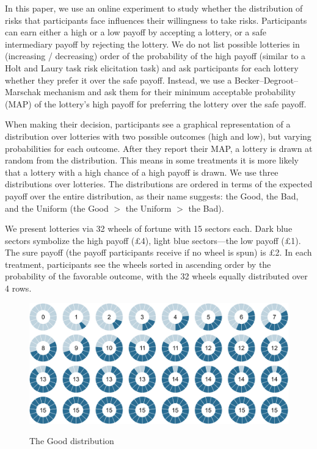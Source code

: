 \documentclass[12pt, a4paper]{article}
\begin{document}
In this paper, we use an online experiment to study whether the distribution of risks that participants face influences their willingness to take risks.
Participants can earn either a high or a low payoff by accepting a lottery, or a safe intermediary payoff by rejecting the lottery.
We do not list possible lotteries in (increasing / decreasing) order of the probability of the high payoff (similar to a Holt and Laury task risk elicitation task) and ask participants for each lottery whether they prefer it over the safe payoff.
Instead, we use a Becker--Degroot--Marschak mechanism and ask them for their minimum acceptable probability (MAP) of the lottery's high payoff for preferring the lottery over the safe payoff.

When making their decision, participants see a graphical representation of a distribution over lotteries with two possible outcomes (high and low), but varying probabilities for each outcome.
After they report their MAP, a lottery is drawn at random from the distribution.
This means in some treatments it is more likely that a lottery with a high chance of a high payoff is drawn.
We use three distributions over lotteries.
The distributions are ordered in terms of the expected payoff over the entire distribution, as their name suggests: the Good, the Bad, and the Uniform (the Good $>$ the Uniform $>$ the Bad).

We present lotteries via 32 wheels of fortune with 15 sectors each.
Dark blue sectors symbolize the high payoff (\pounds4), light blue sectors---the low payoff (\pounds1).
The sure payoff (the payoff participants receive if no wheel is spun) is \pounds2.
In each treatment, participants see the wheels sorted in ascending order by the probability of the favorable outcome, with the 32 wheels equally distributed over 4 rows.

\begin{figure}[h!]
  \centering
 {\includegraphics[width=\linewidth]{Fig1_Left_15.pdf}}
  \caption{The Good distribution}
  \label{fig:TheGood}
\end{figure}
\end{document}
